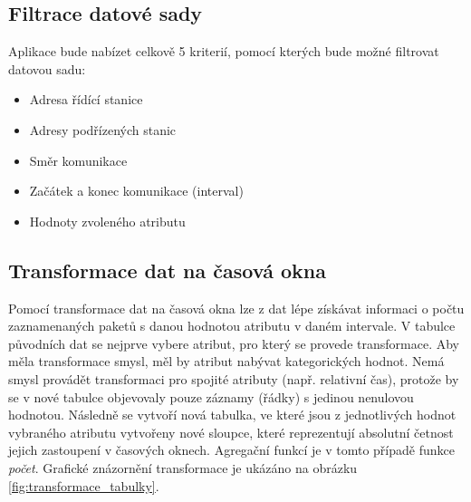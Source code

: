 \subsection{Filtrace datové sady}
\label{filters}

Aplikace bude nabízet celkově 5 kriterií, pomocí kterých bude možné filtrovat datovou sadu:

\begin{itemize}
        \item Adresa řídící stanice
        \item Adresy podřízených stanic
        \item Směr komunikace
        \item Začátek a konec komunikace (interval)
        \item Hodnoty zvoleného atributu
\end{itemize}


\subsection{Transformace dat na časová okna}
\label{data_transformation}

Pomocí transformace dat na časová okna lze z dat lépe získávat informaci o počtu zaznamenaných paketů s danou hodnotou atributu v daném intervale. V tabulce původních dat se nejprve vybere atribut, pro který se provede transformace. Aby měla transformace smysl, měl by atribut nabývat kategorických hodnot. Nemá smysl provádět transformaci pro spojité atributy (např. relativní čas), protože by se v nové tabulce objevovaly pouze záznamy (řádky) s jedinou nenulovou hodnotou. Následně se vytvoří nová tabulka, ve které jsou z jednotlivých hodnot vybraného atributu vytvořeny nové sloupce, které reprezentují absolutní četnost jejich zastoupení v časových oknech. Agregační funkcí je v tomto případě funkce \emph{počet}. Grafické znázornění transformace je ukázáno na obrázku \ref{fig:transformace_tabulky}.


